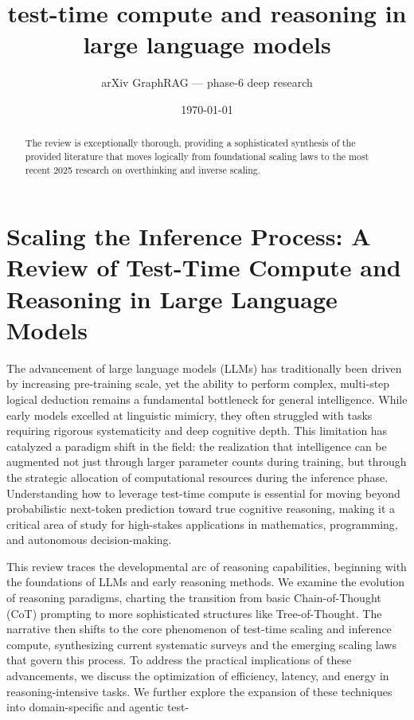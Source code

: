 \documentclass[11pt]{article}
\title{test-time compute and reasoning in large language models}
\author{arXiv GraphRAG --- phase-6 deep research}
\date{\today}
\begin{document}
\maketitle

\begin{abstract}
The review is exceptionally thorough, providing a sophisticated synthesis of the provided literature that moves logically from foundational scaling laws to the most recent 2025 research on overthinking and inverse scaling.
\end{abstract}

\section{Scaling the Inference Process: A Review of Test-Time Compute and Reasoning in Large Language Models}

The advancement of large language models (LLMs) has traditionally been driven by increasing pre-training scale, yet the ability to perform complex, multi-step logical deduction remains a fundamental bottleneck for general intelligence. While early models excelled at linguistic mimicry, they often struggled with tasks requiring rigorous systematicity and deep cognitive depth. This limitation has catalyzed a paradigm shift in the field: the realization that intelligence can be augmented not just through larger parameter counts during training, but through the strategic allocation of computational resources during the inference phase. Understanding how to leverage test-time compute is essential for moving beyond probabilistic next-token prediction toward true cognitive reasoning, making it a critical area of study for high-stakes applications in mathematics, programming, and autonomous decision-making.

This review traces the developmental arc of reasoning capabilities, beginning with the foundations of LLMs and early reasoning methods. We examine the evolution of reasoning paradigms, charting the transition from basic Chain-of-Thought (CoT) prompting to more sophisticated structures like Tree-of-Thought. The narrative then shifts to the core phenomenon of test-time scaling and inference compute, synthesizing current systematic surveys and the emerging scaling laws that govern this process. To address the practical implications of these advancements, we discuss the optimization of efficiency, latency, and energy in reasoning-intensive tasks. We further explore the expansion of these techniques into domain-specific and agentic test-
\end{document}
